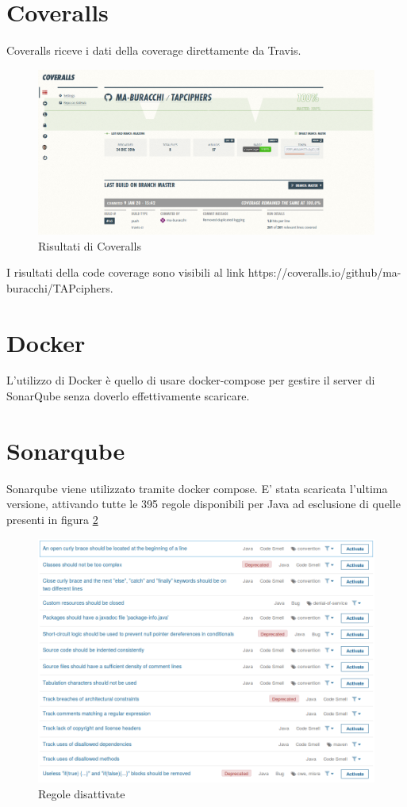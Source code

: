 	\section{Coveralls}
		Coveralls riceve i dati della coverage direttamente da Travis.
		
		\begin{figure}[h]
			\centering
			\includegraphics[scale=0.2]{img/coverall}
			\caption{Risultati di Coveralls}
			\label{fig:coveralls}
		\end{figure}
				
		I risultati della code coverage sono visibili al link https://coveralls.io/github/ma-buracchi/TAPciphers.
		
	\section{Docker}
		L'utilizzo di Docker è quello di usare docker-compose per gestire il server di SonarQube senza doverlo effettivamente scaricare. 
		
	\section{Sonarqube}
		Sonarqube viene utilizzato tramite docker compose. E' stata scaricata l'ultima versione, attivando tutte le 395 regole disponibili per Java ad esclusione di quelle presenti in figura \ref{fig:sonarules}
		
		\begin{figure}[h]
			\centering
			\includegraphics[scale=0.4]{img/sonarqube_rules}
			\caption{Regole disattivate}
			\label{fig:sonarules}
		\end{figure}
		
